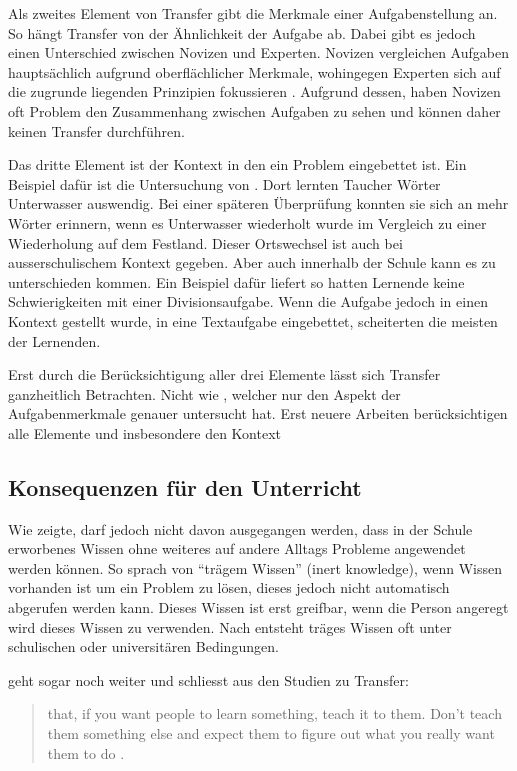 Als zweites Element von Transfer gibt \citeauthor{Marini1995} die Merkmale einer Aufgabenstellung an. So hängt Transfer von der Ähnlichkeit der Aufgabe ab. Dabei gibt es jedoch einen Unterschied zwischen Novizen und Experten. Novizen vergleichen Aufgaben hauptsächlich aufgrund oberflächlicher Merkmale, wohingegen Experten sich auf die zugrunde liegenden Prinzipien fokussieren \citep[s. S. 279]{Marini1995}. Aufgrund dessen, haben Novizen oft Problem den Zusammenhang zwischen Aufgaben zu sehen und können daher keinen Transfer durchführen.

Das dritte Element ist der Kontext in den ein Problem eingebettet ist. Ein Beispiel dafür ist die Untersuchung von \citet{Godden1975}. Dort lernten Taucher Wörter Unterwasser auswendig. Bei einer späteren Überprüfung konnten sie sich an mehr Wörter erinnern, wenn es Unterwasser wiederholt wurde im Vergleich zu einer Wiederholung auf dem Festland. Dieser Ortswechsel ist auch bei ausserschulischem Kontext gegeben. Aber auch innerhalb der Schule kann es zu unterschieden kommen. Ein Beispiel dafür liefert \citet{Schoenfeld1988} so hatten Lernende keine Schwierigkeiten mit einer Divisionsaufgabe. Wenn die Aufgabe jedoch in einen Kontext gestellt wurde, in eine Textaufgabe eingebettet, scheiterten die meisten der Lernenden. 

Erst durch die Berücksichtigung aller drei Elemente lässt sich Transfer ganzheitlich Betrachten. Nicht wie  \citet{Woodworth1901}, welcher nur den Aspekt der Aufgabenmerkmale genauer untersucht hat. Erst neuere Arbeiten berücksichtigen alle Elemente und insbesondere den Kontext \citep{Lobato2002a, Detterman1993, Greeno1996}

\subsection{Konsequenzen für den Unterricht}
\label{sec:TransferUnterricht}

Wie \citet{claxton1990} zeigte, darf jedoch nicht davon ausgegangen werden, dass in der Schule erworbenes Wissen ohne weiteres auf andere Alltags Probleme angewendet werden können. So sprach \citet{Whitehead1929} von "`trägem Wissen"' (inert knowledge), wenn Wissen vorhanden ist um ein Problem zu lösen, dieses jedoch nicht automatisch abgerufen werden kann. Dieses Wissen ist erst greifbar, wenn die Person angeregt wird dieses Wissen zu verwenden. Nach \citet{Whitehead1929} entsteht träges Wissen oft unter schulischen oder universitären Bedingungen. 


\citeauthor{Detterman1993} geht sogar noch weiter und schliesst aus den Studien zu Transfer:
\begin{quote}
that, if you want people to learn something, teach it to them. Don't teach them something else and expect them to figure out what you really want them to do \citep[S. 21]{Detterman1993}.
\end{quote}

